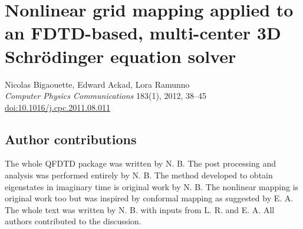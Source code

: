 
\newcommand{\PaperTitleMapping}{Nonlinear grid mapping applied to an FDTD-based, multi-center 3D
                                  Schr\"odinger equation solver}

\section{\PaperTitleMapping}
\label{section:papers:qfdtd}

\begin{flushright}
Nicolas Bigaouette, Edward Ackad, Lora Ramunno\\
\textit{Computer Physics Communications} 183(1), 2012, 38–45\\
\href{http://dx.doi.org/10.1016/j.cpc.2011.08.011}{doi:10.1016/j.cpc.2011.08.011}
\end{flushright}

\HidePDFAbstractNumber

\subsection{Author contributions}
The whole QFDTD package was written by N. B. The post processing and analysis
was performed entirely by N. B. The method developed to obtain eigenstates in
imaginary time is original work by N. B. The nonlinear mapping is original work
too but was inspired by conformal mapping as suggested by E. A. The whole text
was written by N. B. with inputs from L. R. and E. A. All authors contributed to
the discussion.


